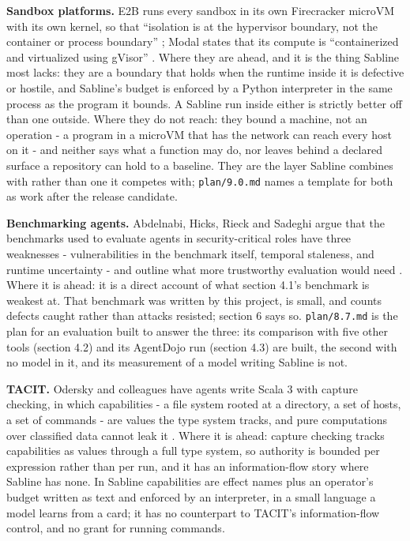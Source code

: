 \documentclass[
]{article}
\newcounter{none} %
\begin{document}
\textbf{Sandbox platforms.} E2B runs every sandbox in its own
Firecracker microVM with its own kernel, so that ``isolation is at the
hypervisor boundary, not the container or process boundary''
\citep{e2b}; Modal states that its compute is ``containerized and
virtualized using gVisor'' \citep{modal}. Where they are ahead, and it
is the thing Sabline most lacks: they are a boundary that holds when the
runtime inside it is defective or hostile, and Sabline's budget is
enforced by a Python interpreter in the same process as the program it
bounds. A Sabline run inside either is strictly better off than one
outside. Where they do not reach: they bound a machine, not an operation
- a program in a microVM that has the network can reach every host on it
- and neither says what a function may do, nor leaves behind a declared
surface a repository can hold to a baseline. They are the layer Sabline
combines with rather than one it competes with; \texttt{plan/9.0.md}
names a template for both as work after the release candidate.

\textbf{Benchmarking agents.} Abdelnabi, Hicks, Rieck and Sadeghi argue
that the benchmarks used to evaluate agents in security-critical roles
have three weaknesses - vulnerabilities in the benchmark itself,
temporal staleness, and runtime uncertainty - and outline what more
trustworthy evaluation would need \citep{abdelnabi2026measuring}. Where
it is ahead: it is a direct account of what section 4.1's benchmark is
weakest at. That benchmark was written by this project, is small, and
counts defects caught rather than attacks resisted; section 6 says so.
\texttt{plan/8.7.md} is the plan for an evaluation built to answer the
three: its comparison with five other tools (section 4.2) and its
AgentDojo run (section 4.3) are built, the second with no model in it,
and its measurement of a model writing Sabline is not.

\textbf{TACIT.} Odersky and colleagues have agents write Scala 3 with
capture checking, in which capabilities - a file system rooted at a
directory, a set of hosts, a set of commands - are values the type
system tracks, and pure computations over classified data cannot leak it
\citep{odersky2026tacit}. Where it is ahead: capture checking tracks
capabilities as values through a full type system, so authority is
bounded per expression rather than per run, and it has an
information-flow story where Sabline has none. In Sabline capabilities
are effect names plus an operator's budget written as text and enforced
by an interpreter, in a small language a model learns from a card; it
has no counterpart to TACIT's information-flow control, and no grant for
running commands.
\end{document}
